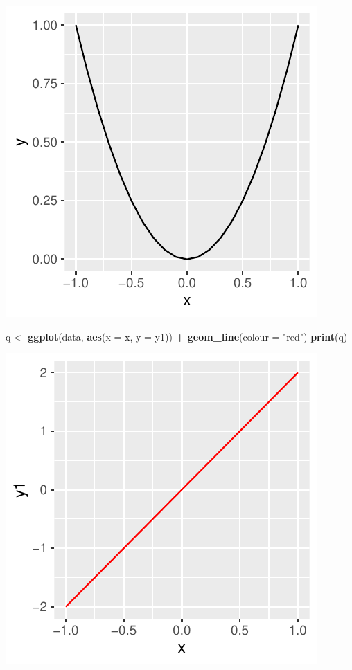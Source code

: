 \documentclass[
]{book}
\newenvironment{Shaded}{\begin{snugshade}}{\end{snugshade}}
\newcommand{\AttributeTok}[1]{\textcolor[rgb]{0.13,0.29,0.53}{#1}}
\newcommand{\FunctionTok}[1]{\textcolor[rgb]{0.13,0.29,0.53}{\textbf{#1}}}
\newcommand{\NormalTok}[1]{#1}
\newcommand{\OtherTok}[1]{\textcolor[rgb]{0.56,0.35,0.01}{#1}}
\newcommand{\SpecialCharTok}[1]{\textcolor[rgb]{0.81,0.36,0.00}{\textbf{#1}}}
\newcommand{\StringTok}[1]{\textcolor[rgb]{0.31,0.60,0.02}{#1}}
\begin{document}
\includegraphics{bookdown-demo_files/figure-latex/unnamed-chunk-10-1.pdf}

\begin{Shaded}
\begin{Highlighting}[]
\NormalTok{q }\OtherTok{\textless{}{-}} \FunctionTok{ggplot}\NormalTok{(data, }\FunctionTok{aes}\NormalTok{(}\AttributeTok{x =}\NormalTok{ x, }\AttributeTok{y =}\NormalTok{ y1)) }\SpecialCharTok{+}
  \FunctionTok{geom\_line}\NormalTok{(}\AttributeTok{colour =} \StringTok{"red"}\NormalTok{)}
\FunctionTok{print}\NormalTok{(q)}
\end{Highlighting}
\end{Shaded}

\includegraphics{bookdown-demo_files/figure-latex/unnamed-chunk-10-2.pdf}
\end{document}
